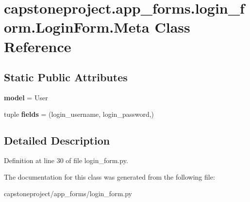 \hypertarget{classcapstoneproject_1_1app__forms_1_1login__form_1_1_login_form_1_1_meta}{}\section{capstoneproject.\+app\+\_\+forms.\+login\+\_\+form.\+Login\+Form.\+Meta Class Reference}
\label{classcapstoneproject_1_1app__forms_1_1login__form_1_1_login_form_1_1_meta}
\subsection*{Static Public Attributes}
\begin{DoxyCompactItemize}
\item 
\mbox{\label{classcapstoneproject_1_1app__forms_1_1login__form_1_1_login_form_1_1_meta_a0af18bd1be0cda5bdc6d8ae7a223ec5d}} 
{\bfseries model} = User
\item 
\mbox{\label{classcapstoneproject_1_1app__forms_1_1login__form_1_1_login_form_1_1_meta_ae1f688487e76922f99a4904c1084f099}} 
tuple {\bfseries fields} = (\textquotesingle{}login\+\_\+username\textquotesingle{}, \textquotesingle{}login\+\_\+password\textquotesingle{},)
\end{DoxyCompactItemize}


\subsection{Detailed Description}


Definition at line 30 of file login\+\_\+form.\+py.



The documentation for this class was generated from the following file\+:\begin{DoxyCompactItemize}
\item 
capstoneproject/app\+\_\+forms/login\+\_\+form.\+py\end{DoxyCompactItemize}
